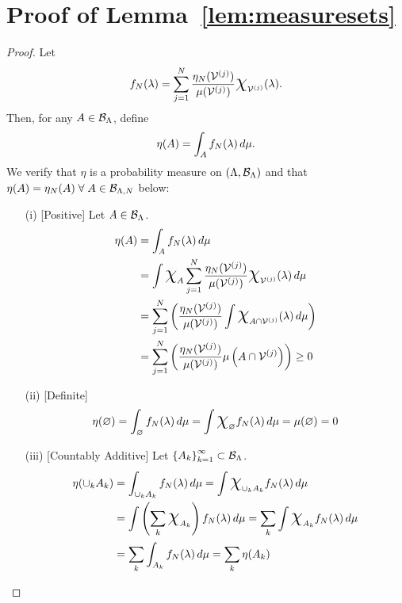 \section{Proof of Lemma~\ref{lem:measuresets}}\label{app:measuresets}
\begin{proof}
Let
\begin{equation}
f_N (\param) = \sum_{j=1}^{N} \frac{\eta_N (\VV^{(j)}) }{\mu (\VV^{(j)})} \Chi_{\VV^{(j)}} (\param).
\end{equation}
Then, for any $A\in\mathcal{B}_{\Lambda}$, define
\begin{equation}
\eta (A) = \int_A f_N (\lambda) \, d\mu.
\end{equation}
We verify that $\eta$ is a probability measure on $({\Lambda}, \mathcal{B}_{\Lambda})$ and that $\eta(A) = \eta_N(A) \; \forall \; A\in\mathcal{B}_{{\Lambda}, N}$ below:
\begin{itemize}
\item[(i)][Positive]
Let $A\in \mathcal{B}_{{\Lambda}}$.
\begin{equation*}
\begin{split}
\eta (A) &= \int_A f_N (\param) \, d\mu \\
&=  \int \Chi_A \sum_{j=1}^{N} \frac{\eta_N (\VV^{(j)}) }{\mu (\VV^{(j)})} \Chi_{\VV^{(j)}} (\param) \, d\mu \\
&= \sum_{j=1}^{N} \left ( \frac{\eta_N (\VV^{(j)}) }{\mu (\VV^{(j)})} \int \Chi_{A\cap\VV^{(j)}} (\param) \, d\mu \right ) \\
&= \sum_{j=1}^{N} \left ( \frac{\eta_N (\VV^{(j)}) }{\mu (\VV^{(j)})} \mu\left (A\cap\VV^{(j)}\right ) \right ) \geq 0
\end{split}
\end{equation*}

\item[(ii)][Definite]
\begin{equation*}
\eta (\nullset) = \int_\nullset f_N (\param) \, d\mu =\int \Chi_\nullset f_N (\param) \, d\mu = \mu(\nullset) = 0
\end{equation*}

\item[(iii)][Countably Additive]
Let $\left\{A_k\right\}_{k=1}^{\infty} \subset \mathcal{B}_{{\Lambda}}$.
\begin{equation*}
\begin{split}
\eta (\cup_k A_k) &= \int_{\cup_k A_k} f_N (\param) \, d\mu 
= \int \Chi_{\cup_k A_k} f_N (\param) \, d\mu \\
&= \int \left( \sum_k \Chi_{A_k} \right ) f_N (\param) \, d\mu
=   \sum_k \int \Chi_{A_k} f_N (\param) \, d\mu \\
&=   \sum_k \int_{A_k} f_N (\param) \, d\mu = \sum_k \eta(A_k)
\end{split}
\end{equation*}



\end{itemize}
\end{proof}
